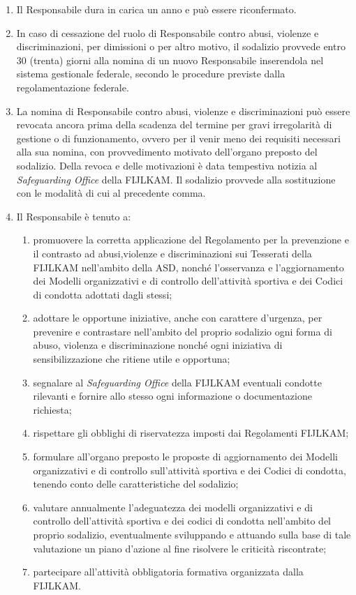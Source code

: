 \documentclass{djtsasddoc}
\begin{document}
\begin{enumerate}
		\item Il Responsabile dura in carica un anno e può essere riconfermato.
		\item In caso di cessazione del ruolo di Responsabile contro abusi, violenze e discriminazioni, per dimissioni o per altro motivo, il sodalizio provvede entro 30 (trenta) giorni alla nomina di un nuovo Responsabile inserendola nel sistema gestionale federale, secondo le procedure previste dalla regolamentazione federale.
		\item La nomina di Responsabile contro abusi, violenze e discriminazioni può essere revocata ancora prima della scadenza del termine per gravi irregolarità di gestione o di funzionamento, ovvero per il venir meno dei requisiti necessari alla sua nomina, con provvedimento motivato dell'organo preposto del sodalizio. Della revoca e delle motivazioni è data tempestiva notizia al \textit{Safeguarding Office} della FIJLKAM. Il sodalizio provvede alla sostituzione con le modalità di cui al precedente comma.
		\item Il Responsabile è tenuto a:
		\begin{enumerate}
			\item promuovere la corretta applicazione del Regolamento per la prevenzione e il contrasto ad abusi,violenze e discriminazioni sui Tesserati della FIJLKAM nell'ambito della ASD, nonché l'osservanza e l'aggiornamento dei Modelli organizzativi e di controllo dell'attività sportiva e dei Codici di condotta adottati dagli stessi;
			\item adottare le opportune iniziative, anche con carattere d'urgenza, per prevenire e contrastare nell'ambito del proprio sodalizio ogni forma di abuso, violenza e discriminazione nonché ogni iniziativa di sensibilizzazione che ritiene utile e opportuna;
			\item segnalare al \textit{Safeguarding Office} della FIJLKAM eventuali condotte rilevanti e fornire allo stesso ogni informazione o documentazione richiesta;
			\item rispettare gli obblighi di riservatezza imposti dai Regolamenti FIJLKAM;
			\item formulare all'organo preposto le proposte di aggiornamento dei Modelli organizzativi e di controllo sull'attività sportiva e dei Codici di condotta, tenendo conto delle caratteristiche del sodalizio;
			\item valutare annualmente l'adeguatezza dei modelli organizzativi e di controllo dell'attività sportiva e dei codici di condotta nell'ambito del proprio sodalizio, eventualmente sviluppando e attuando sulla base di tale valutazione un piano d'azione al fine risolvere le criticità riscontrate; 
			\item partecipare all'attività obbligatoria formativa organizzata dalla FIJLKAM.
		\end{enumerate}
	\end{enumerate}
	
\end{document}
